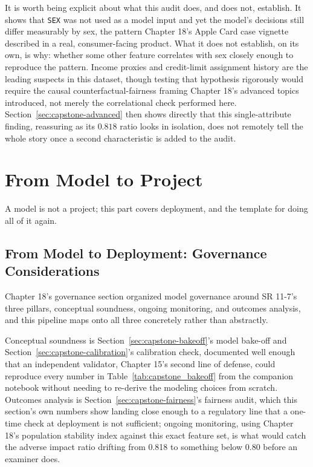 \documentclass[../ai_in_finance]{subfiles}
\begin{document}
It is worth being explicit about what this audit does, and does not, establish. It shows that \texttt{SEX} was not used as a model input and yet the model's decisions still differ measurably by sex, the pattern Chapter 18's Apple Card case vignette described in a real, consumer-facing product. What it does not establish, on its own, is why: whether some other feature correlates with sex closely enough to reproduce the pattern. Income proxies and credit-limit assignment history are the leading suspects in this dataset, though testing that hypothesis rigorously would require the causal counterfactual-fairness framing Chapter 18's advanced topics introduced, not merely the correlational check performed here. Section~\ref{sec:capstone-advanced} then shows directly that this single-attribute finding, reassuring as its $0.818$ ratio looks in isolation, does not remotely tell the whole story once a second characteristic is added to the audit.

\section{From Model to Project}

A model is not a project; this part covers deployment, and the template for doing all of it again.

\subsection{From Model to Deployment: Governance Considerations}
\label{sec:capstone-governance}

Chapter 18's governance section organized model governance around SR 11-7's three pillars, conceptual soundness, ongoing monitoring, and outcomes analysis, and this pipeline maps onto all three concretely rather than abstractly.

Conceptual soundness is Section~\ref{sec:capstone-bakeoff}'s model bake-off and Section~\ref{sec:capstone-calibration}'s calibration check, documented well enough that an independent validator, Chapter 15's second line of defense, could reproduce every number in Table~\ref{tab:capstone_bakeoff} from the companion notebook without needing to re-derive the modeling choices from scratch. Outcomes analysis is Section~\ref{sec:capstone-fairness}'s fairness audit, which this section's own numbers show landing close enough to a regulatory line that a one-time check at deployment is not sufficient; ongoing monitoring, using Chapter 18's population stability index against this exact feature set, is what would catch the adverse impact ratio drifting from 0.818 to something below 0.80 before an examiner does.
\end{document}
